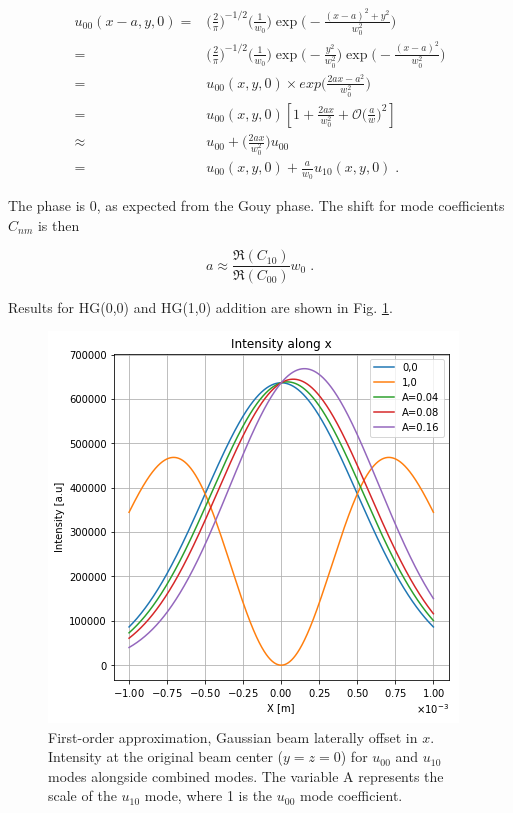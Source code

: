 \documentclass[aps,twoside,secnumarabic,balancelastpage,amsmath,amssymb,nofootinbib,hyperref=pdftex]{revtex4}
\newcommand{\bigfrac}[2]{\Big( \frac{#1}{#2}\Big)}
\begin{document}
	\begin{align}\label{eq:9}
		u_{00}(x-a,y,0) 
			=&\Big(\frac{2}{\pi}\Big)^{-1/2}
			\Big(\frac{1}{w_{0}}\Big)
			\exp\Big(-\frac{(x-a)^{2}+y^{2}}{w_{0}^{2}}\Big)
		\nonumber\\	
			= & \Big(\frac{2}{\pi}\Big)^{-1/2} 
			\Big(\frac{1}{w_{0}}\Big)
			\exp\Big(-\frac{y^{2}}{w_{0}^{2}}\Big)
			\exp\Big(-\frac{(x-a)^{2}}{w_{0}^{2}}\Big)
		\nonumber\\	
			= & u_{00}(x,y,0) \times exp \Big( \frac{2ax - a^{2}}{w_{0}^2} 			\Big)
		\nonumber\\
			=	& u_{00}(x,y,0)
			\left[ 1+ \frac{2ax}{w_{0}^{2}}+			\mathcal{O} \bigfrac{a}{w}^{2} \right]
		\nonumber\\ 
			\nonumber\approx	& u_{00} + \bigfrac{2ax}{w_{0}^{2}} u_{00}
			\\
	= &u_{00}(x,y,0)+\frac{a}{w_{0}}u_{10}(x,y,0) \;.
	\end{align}
	
The phase is 0, as expected from the Gouy phase. The shift for mode coefficients $C_{nm}$ is then

	\begin{equation}
		a \approx \frac{\Re(C_{10})}{\Re(C_{00})}w_{0} \;.
	\end{equation}		
	
	Results for HG(0,0) and HG(1,0) addition are shown in Fig. \ref{fig:1}.
	
	\begin{figure}[ht]
	\centering
	\includegraphics[scale=.7]{beamshift}
	\caption{First-order approximation, Gaussian beam laterally offset in $x$. Intensity at the original beam center ($y=z=0$) for $u_{00}$ and $u_{10}$ modes alongside combined modes. The variable A represents the scale of the $u_{10}$ mode, where 1 is the $u_{00}$ mode coefficient.}
	\label{fig:1}
	\end{figure}
	
\end{document}
